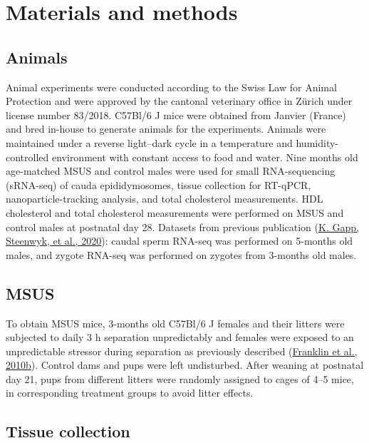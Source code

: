 \documentclass[12pt,twoside]{reedthesis}
\begin{document}
\hypertarget{materials-and-methods}{%
\section{Materials and methods}\label{materials-and-methods}}

\hypertarget{animals}{%
\subsection{Animals}\label{animals}}

Animal experiments were conducted according to the Swiss Law for Animal
Protection and were approved by the cantonal veterinary office in Zürich
under license number 83/2018. C57Bl/6 J mice were obtained from Janvier
(France) and bred in-house to generate animals for the experiments.
Animals were maintained under a reverse light--dark cycle in a
temperature and humidity-controlled environment with constant access to
food and water. Nine months old age-matched MSUS and control males were
used for small RNA-sequencing (sRNA-seq) of cauda epididymosomes, tissue
collection for RT-qPCR, nanoparticle-tracking analysis, and total
cholesterol measurements. HDL cholesterol and total cholesterol
measurements were performed on MSUS and control males at postnatal day
28. Datasets from previous publication (\protect\hyperlink{ref-gapp_2020}{K. Gapp, Steenwyk, et al., 2020}): caudal sperm
RNA-seq was performed on 5-months old males, and zygote RNA-seq was
performed on zygotes from 3-months old males.

\hypertarget{msus}{%
\subsection{MSUS}\label{msus}}

To obtain MSUS mice, 3-months old C57Bl/6 J females and their litters
were subjected to daily 3 h separation unpredictably and females were
exposed to an unpredictable stressor during separation as previously
described (\protect\hyperlink{ref-franklin_2010}{Franklin et al., 2010b}). Control dams and pups were left undisturbed.
After weaning at postnatal day 21, pups from different litters were
randomly assigned to cages of 4--5 mice, in corresponding treatment
groups to avoid litter effects.

\hypertarget{tissue-collection}{%
\subsection{Tissue collection}\label{tissue-collection}}
\end{document}
